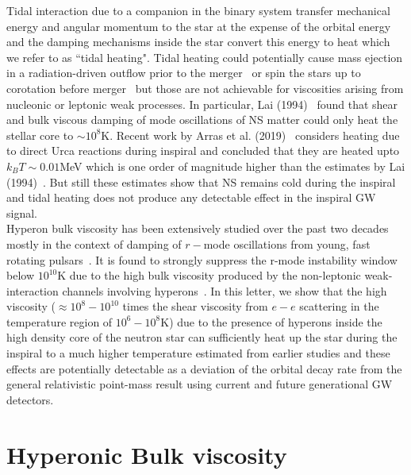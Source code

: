 \documentclass[%
 reprint,
 amsmath,amssymb,
 aps,
]{revtex4-2}
\begin{document}
Tidal interaction due to a companion in the binary system  transfer mechanical energy and angular momentum to the star at the expense of the orbital energy and the damping mechanisms inside the star convert this energy to heat which we refer to as ``tidal heating". Tidal heating could potentially cause mass ejection in a radiation-driven outflow prior to the merger~\cite{Rees1992} or spin the stars up to corotation before merger~\cite{Kochanek1992,Bildsten1992} but those are not achievable for viscosities arising from nucleonic or leptonic weak processes. In particular, Lai (1994)~\cite{Lai_1994} found that shear and bulk viscous damping of mode oscillations of NS matter could only heat the stellar core to $\sim 10^8$K. Recent work by Arras et al. (2019)~\cite{Arras2019} considers heating due to direct Urca reactions during inspiral and concluded that they are heated upto $k_BT \sim 0.01$MeV which is one order of magnitude higher than  the estimates by Lai (1994)~\cite{Lai_1994}. But still these estimates show that NS remains cold during the inspiral and tidal heating does not produce any detectable effect in the inspiral GW signal.  \\

Hyperon bulk viscosity has been extensively studied over the past two decades mostly in the context of damping of $r-$mode oscillations from young, fast rotating pulsars~\cite{Jones2001,Lindblom2002,Debi_2006,Dalen2004,Jha2010,Haskell2010,Ofengeim,Alford2021,Jha2022}. It is found to strongly suppress the r-mode instability window below $10^{10}$K due to the high bulk viscosity produced by the non-leptonic weak-interaction channels involving hyperons~\cite{Lindblom2002,Haskell2010}. In this letter, we show that the high viscosity ($\approx 10^{8} - 10^{10}$ times the shear viscosity from $e-e$ scattering in the temperature region of $10^{6}-10^8$K) due to the presence of hyperons inside the high density core of the neutron star can sufficiently heat up the star during the inspiral to a much higher temperature estimated from earlier studies and these effects are potentially detectable as a deviation of the orbital decay rate from the general relativistic point-mass result using current and future generational GW detectors. 


\section{\label{sec:HyperonBV} 
Hyperonic Bulk viscosity}
\end{document}

